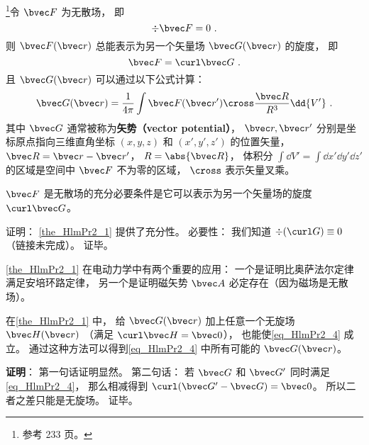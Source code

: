 
\begin{issues}
\issueTODO
\end{issues}


\begin{theorem}{}\label{the_HlmPr2_1}
\footnote{参考 \cite{GriffE} 233 页。}令 $\bvec F$ 为无散场， 即
\begin{equation}
\div \bvec F = 0~.
\end{equation}
则 $\bvec F(\bvec r)$ 总能表示为另一个矢量场 $\bvec G(\bvec r)$ 的旋度， 即
\begin{equation}\label{eq_HlmPr2_4}
\bvec F = \curl \bvec G~.
\end{equation}
且 $\bvec G(\bvec r)$ 可以通过以下公式计算：
\begin{equation}\label{eq_HlmPr2_1}
\bvec G(\bvec r) = \frac{1}{4\pi}\int \bvec F(\bvec r') \cross \frac{\bvec R}{R^3} \dd{V'}~.
\end{equation}
其中 $\bvec G$ 通常被称为\textbf{矢势（vector potential）}， $\bvec r, \bvec r'$ 分别是坐标原点指向三维直角坐标 $(x, y, z)$ 和 $(x', y', z')$ 的位置矢量， $\bvec R = \bvec r - \bvec r'$， $R = \abs{\bvec R}$， 体积分 $\int\dd{V'} = \int\dd{x'}\dd{y'}\dd{z'}$ 的区域是空间中 $\bvec F$ 不为零的区域， $\cross$ 表示矢量叉乘。
\end{theorem}

\begin{corollary}{}
$\bvec F$ 是无散场的充分必要条件是它可以表示为另一个矢量场的旋度 $\curl \bvec G$。
\end{corollary}
证明： \autoref{the_HlmPr2_1} 提供了充分性。 必要性： 我们知道 $\div (\curl G) \equiv 0$ （链接未完成）。 证毕。

\autoref{the_HlmPr2_1} 在电动力学中有两个重要的应用： 一个是证明比奥萨法尔定律满足安培环路定律， 另一个是证明磁矢势 $\bvec A$ 必定存在（因为磁场是无散场）。

\begin{corollary}{}\label{cor_HlmPr2_1}
在\autoref{the_HlmPr2_1} 中， 给 $\bvec G(\bvec r)$ 加上任意一个无旋场 $\bvec H(\bvec r)$ （满足 $\curl \bvec H = \bvec 0$）， 也能使\autoref{eq_HlmPr2_4} 成立。 通过这种方法可以得到\autoref{eq_HlmPr2_4} 中所有可能的 $\bvec G(\bvec r)$。
\end{corollary}
\textbf{证明}： 第一句话证明显然。 第二句话： 若 $\bvec G$ 和 $\bvec G'$ 同时满足\autoref{eq_HlmPr2_4}， 那么相减得到 $\curl (\bvec G' - \bvec G) = \bvec 0$。 所以二者之差只能是无旋场。 证毕。

